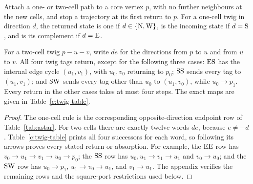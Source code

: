 \begin{lemma}\label{c:twig}
Attach a one- or two-cell path to a core vertex \(p\), with no further
neighbours at the new cells, and stop a trajectory at its first return to
\(p\). For a one-cell twig in direction \(d\), the returned state is one
if \(d\in\{\mathrm{N},\mathrm{W}\}\), is the incoming state if \(d=\mathrm{S}\), and is
its complement if \(d=\mathrm{E}\).

For a two-cell twig \(p-u-v\), write \(de\) for the directions from
\(p\) to \(u\) and from \(u\) to \(v\). All four twig tags return,
except for the following three cases: \(\mathrm{E}\mathrm{S}\) has the internal edge
cycle \((u_1,v_1)\), with \(u_0,v_0\) returning to \(p_0\);
\(\mathrm{S}\mathrm{S}\) sends every tag to \((u_1,v_1)\); and
\(\mathrm{S}\mathrm{W}\) sends every tag other than \(u_0\) to \((u_1,v_0)\),
while \(u_0\to p_1\). Every return in the other cases takes at most four
steps. The exact maps are given in Table~\ref{c:twig-table}.
\end{lemma}
\begin{proof}
The one-cell rule is the corresponding opposite-direction endpoint row of
Table~\ref{tab:astar}. For two cells there are exactly twelve words \(de\),
because \(e\ne-d\). Table~\ref{c:twig-table} prints all four successors
for each word, so following its arrows proves every stated return or
absorption. For example, the \(\mathrm{E}\mathrm{E}\) row has
\(v_0\to u_1\to v_1\to u_0\to p_0\); the \(\mathrm{S}\mathrm{S}\) row has
\(u_0,u_1\to v_1\to u_1\) and \(v_0\to u_0\); and the
\(\mathrm{S}\mathrm{W}\) row has \(u_0\to p_1\),
\(u_1\to v_0\to u_1\), and \(v_1\to u_1\).
The appendix verifies the remaining rows and the square-port restrictions
used below.
\end{proof}

